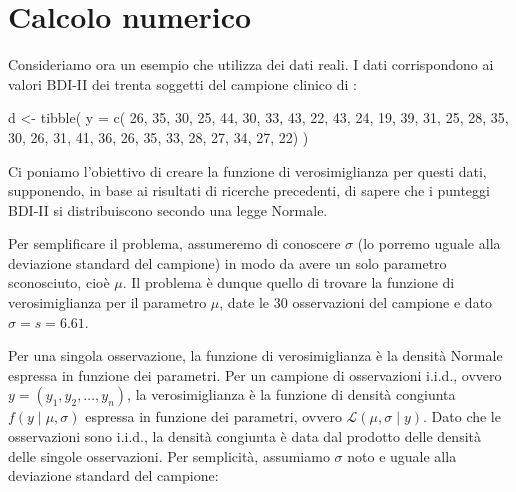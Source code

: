 \documentclass[
  11pt,
]{krantz}
\makeatletter
\newenvironment{Shaded}{\begin{snugshade}}{\end{snugshade}}
\newcommand{\AttributeTok}[1]{\textcolor[rgb]{0.61,0.61,0.61}{#1}}
\newcommand{\DecValTok}[1]{\textcolor[rgb]{0.06,0.06,0.06}{#1}}
\newcommand{\FunctionTok}[1]{\textcolor[rgb]{0,0,0}{#1}}
\newcommand{\NormalTok}[1]{#1}
\newcommand{\OtherTok}[1]{\textcolor[rgb]{0.37,0.37,0.37}{#1}}
\newenvironment{kframe}{%
\medskip{}
\setlength{\fboxsep}{.8em}
 \def\at@end@of@kframe{}%
 \ifinner\ifhmode%
  \def\at@end@of@kframe{\end{minipage}}%
  \begin{minipage}{\columnwidth}%
 \fi\fi%
 \def\FrameCommand##1{\hskip\@totalleftmargin \hskip-\fboxsep
 \colorbox{shadecolor}{##1}\hskip-\fboxsep
     \hskip-\linewidth \hskip-\@totalleftmargin \hskip\columnwidth}%
 \MakeFramed {\advance\hsize-\width
   \@totalleftmargin\z@ \linewidth\hsize
   \@setminipage}}%
 {\par\unskip\endMakeFramed%
 \at@end@of@kframe}
\renewenvironment{Shaded}{\begin{kframe}}{\end{kframe}}
\theoremstyle{definition}
\theoremstyle{definition}
\theoremstyle{definition}
\theoremstyle{definition}
\theoremstyle{remark}
\makeatother
\begin{document}
\hypertarget{calcolo-numerico-1}{%
\section*{Calcolo numerico}\label{calcolo-numerico-1}}


Consideriamo ora un esempio che utilizza dei dati reali. I dati corrispondono ai valori BDI-II dei trenta soggetti del campione clinico di \citet{zetschefuture2019}:

\begin{Shaded}
\begin{Highlighting}[]
\NormalTok{d }\OtherTok{\textless{}{-}} \FunctionTok{tibble}\NormalTok{(}
  \AttributeTok{y =} \FunctionTok{c}\NormalTok{(}
    \DecValTok{26}\NormalTok{, }\DecValTok{35}\NormalTok{, }\DecValTok{30}\NormalTok{, }\DecValTok{25}\NormalTok{, }\DecValTok{44}\NormalTok{, }\DecValTok{30}\NormalTok{, }\DecValTok{33}\NormalTok{, }\DecValTok{43}\NormalTok{, }\DecValTok{22}\NormalTok{, }\DecValTok{43}\NormalTok{, }\DecValTok{24}\NormalTok{, }\DecValTok{19}\NormalTok{, }\DecValTok{39}\NormalTok{, }\DecValTok{31}\NormalTok{, }\DecValTok{25}\NormalTok{, }
    \DecValTok{28}\NormalTok{, }\DecValTok{35}\NormalTok{, }\DecValTok{30}\NormalTok{, }\DecValTok{26}\NormalTok{, }\DecValTok{31}\NormalTok{, }\DecValTok{41}\NormalTok{, }\DecValTok{36}\NormalTok{, }\DecValTok{26}\NormalTok{, }\DecValTok{35}\NormalTok{, }\DecValTok{33}\NormalTok{, }\DecValTok{28}\NormalTok{, }\DecValTok{27}\NormalTok{, }\DecValTok{34}\NormalTok{, }\DecValTok{27}\NormalTok{, }\DecValTok{22}\NormalTok{)}
\NormalTok{)}
\end{Highlighting}
\end{Shaded}

Ci poniamo l'obiettivo di creare la funzione di verosimiglianza per questi dati, supponendo, in base ai risultati di ricerche precedenti, di sapere che i punteggi BDI-II si distribuiscono secondo una legge Normale.

Per semplificare il problema, assumeremo di conoscere \(\sigma\) (lo porremo uguale alla deviazione standard del campione) in modo da avere un solo parametro sconosciuto, cioè \(\mu\). Il problema è dunque quello di trovare la funzione di verosimiglianza per il parametro \(\mu\), date le 30 osservazioni del campione e dato \(\sigma = s = 6.61\).

Per una singola osservazione, la funzione di verosimiglianza è la densità Normale espressa in funzione dei parametri. Per un campione di osservazioni i.i.d., ovvero \(y = (y_1, y_2, \dots, y_n)\), la verosimiglianza è la funzione di densità congiunta \(f(y \mid \mu, \sigma)\) espressa in funzione dei parametri, ovvero \(\mathcal{L}(\mu, \sigma \mid y)\). Dato che le osservazioni sono i.i.d., la densità congiunta è data dal prodotto delle densità delle singole osservazioni. Per semplicità, assumiamo \(\sigma\) noto e uguale alla deviazione standard del campione:
\end{document}
